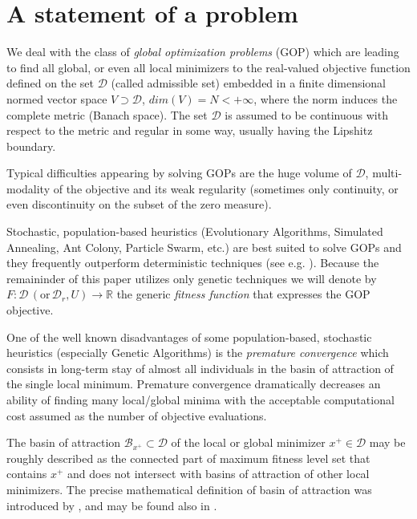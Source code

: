 \section{A statement of a problem}
\label{sec:statementOfProblem}

We deal with the class of \textit{global optimization problems} (GOP)
which are leading to find all global, or even all local minimizers 
to the real-valued objective function defined on the set $\mathcal{D}$ 
(called admissible set) embedded
in a finite dimensional normed vector space $V \supset \mathcal{D}$, 
$dim(V) = N < +\infty$, where the norm
induces the complete metric (Banach space). The set $\mathcal{D}$
is assumed to be continuous with respect to the metric and regular
in some way, usually having the Lipshitz boundary.

Typical difficulties appearing by solving GOPs are 
the huge volume of $\mathcal{D}$, multi-modality of the objective
and its weak regularity (sometimes only continuity, or even
discontinuity on the subset of the zero measure).

Stochastic, population-based heuristics (Evolutionary Algorithms, Simulated Annealing, Ant Colony, 
Particle Swarm, etc.) are best suited to solve GOPs
and they frequently outperform deterministic techniques
(see e.g. \cite{PardalosRomeijn2002}).
Because the remaininder of this paper utilizes only genetic techniques
we will denote by 
$F: \mathcal{D} \, (\text{or} \, \mathcal{D}_r, U) \rightarrow \mathbb{R}$ 
the generic \textit{fitness function} that expresses the GOP objective.

One of the well known disadvantages of some population-based, stochastic heuristics 
(especially Genetic Algorithms) is the \textit{premature convergence} which
consists in long-term stay of almost all individuals in the basin of attraction
of the single local minimum. Premature convergence dramatically decreases 
an ability of finding many local/global minima with the acceptable 
computational cost assumed as the number of objective evaluations.


The basin of attraction $\mathcal{B}_{x^+} \subset \mathcal{D}$ 
of the local or global minimizer ${x^+} \in \mathcal{D}$ may be roughly described 
as the connected part of maximum fitness level set that contains
${x^+}$ and does not intersect with basins of attraction of other
local minimizers.
The precise mathematical definition of basin of attraction
was introduced by \cite{RinnoyKanTimmer1987a}, \cite{DixonSzego1975}
and may be found also in \cite{Schaefer2007}.

